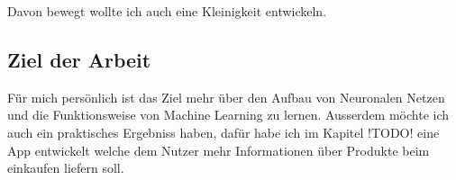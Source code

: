 Davon bewegt wollte ich auch eine Kleinigkeit entwickeln.

\subsection{Ziel der Arbeit}

Für mich persönlich ist das Ziel mehr über den Aufbau von Neuronalen Netzen und die Funktionsweise von Machine Learning zu lernen. Ausserdem möchte ich auch ein praktisches Ergebniss haben, dafür habe ich im Kapitel !TODO! eine App entwickelt welche dem Nutzer mehr Informationen über Produkte beim einkaufen liefern soll.